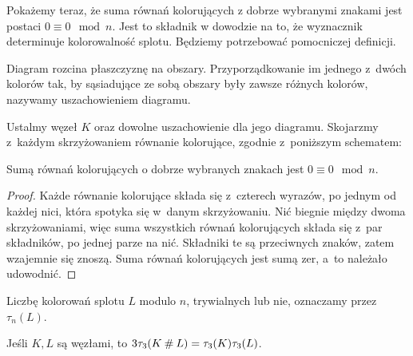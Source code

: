 Pokażemy teraz, że suma równań kolorujących z dobrze wybranymi znakami jest postaci $0 \equiv 0 \mod n$.
Jest to składnik w dowodzie na to, że wyznacznik determinuje kolorowalność splotu.
Będziemy potrzebować pomocniczej definicji.

\begin{definition}[uszachowienie]
%
    Diagram rozcina płaszczyznę na obszary.
    Przyporządkowanie im jednego z~dwóch kolorów tak, by sąsiadujące ze sobą obszary były zawsze różnych kolorów, nazywamy uszachowieniem diagramu.
\end{definition}

Ustalmy węzeł $K$ oraz dowolne uszachowienie dla jego diagramu.
Skojarzmy z~każdym skrzyżowaniem równanie kolorujące, zgodnie z~poniższym schematem:
\begin{comment}
\begin{figure}[H]
    \begin{minipage}[b]{.48\linewidth}
    \[
        \HugeCrossingChessboardA
    \]
    \subcaption{$+a-b+a-c=0 \mod n$}
    \end{minipage}
    \begin{minipage}[b]{.48\linewidth}
    \[
        \HugeCrossingChessboardB
    \]
    \subcaption{$-a+b-a+c=0 \mod n$}
    \end{minipage}
\end{figure}
\end{comment}

\begin{proposition}
    \label{prp:colouring_sum_zero}
    Sumą równań kolorujących o dobrze wybranych znakach jest $0 \equiv 0 \mod n$.
\end{proposition}

\begin{proof}
    Każde równanie kolorujące składa się z~czterech wyrazów, po jednym od każdej nici, która spotyka się w~danym skrzyżowaniu.
    Nić biegnie między dwoma skrzyżowaniami, więc suma wszystkich równań kolorujących składa się z~par składników, po jednej parze na nić.
    Składniki te są przeciwnych znaków, zatem wzajemnie się znoszą.
    Suma równań kolorujących jest sumą zer, a~to należało udowodnić.
\end{proof}

Liczbę kolorowań splotu $L$ modulo $n$, trywialnych lub nie, oznaczamy przez $\tau_n(L)$.

\begin{proposition}
    Jeśli $K, L$ są węzłami, to $3\tau_3(K \mathbin{\#} L) = \tau_3(K)\tau_3(L)$.
\end{proposition}

